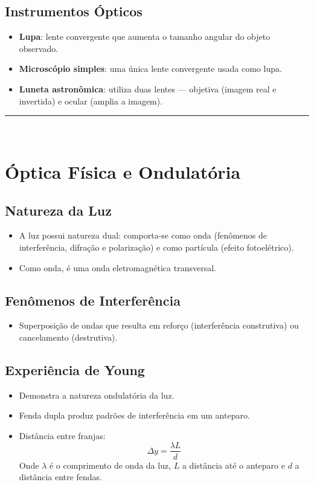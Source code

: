\documentclass[a4paper,12pt]{article}
\begin{document}
\begin{multicols}{2}
\subsection{Instrumentos Ópticos}
\begin{itemize}
    \item \textbf{Lupa}: lente convergente que aumenta o tamanho angular do objeto observado.
    \item \textbf{Microscópio simples}: uma única lente convergente usada como lupa.
    \item \textbf{Luneta astronômica}: utiliza duas lentes — objetiva (imagem real e invertida) e ocular (amplia a imagem).
\end{itemize}

\noindent\rule{\linewidth}{1pt}\\

\section{Óptica Física e Ondulatória}

\subsection{Natureza da Luz}
\begin{itemize}
    \item A luz possui natureza dual: comporta-se como onda (fenômenos de interferência, difração e polarização) e como partícula (efeito fotoelétrico).
    \item Como onda, é uma onda eletromagnética transversal.
\end{itemize}

\subsection{Fenômenos de Interferência}
\begin{itemize}
    \item Superposição de ondas que resulta em reforço (interferência construtiva) ou cancelamento (destrutiva).
\end{itemize}

\subsection{Experiência de Young}
\begin{itemize}
    \item Demonstra a natureza ondulatória da luz.
    \item Fenda dupla produz padrões de interferência em um anteparo.
    \item Distância entre franjas:
    \[
        \Delta y = \frac{\lambda L}{d}
    \]
    Onde $\lambda$ é o comprimento de onda da luz, $L$ a distância até o anteparo e $d$ a distância entre fendas.
\end{itemize}


\end{multicols}
\end{document}
